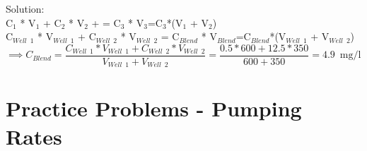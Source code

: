 \begin{enumerate}
\vspace{0.2cm}
Solution:\\
\vspace{0.2cm}
C$_1$ * V$_1$ + C$_2$ * V$_2$ + =  C$_3$ * V$_3$=C$_3$*(V$_1$ + V$_2$)\\
\vspace{0.2cm}
C$_{Well \enspace 1}$ * V$_{Well \enspace 1}$ + C$_{Well \enspace 2}$ * V$_{Well \enspace 2}$ =  C$_{Blend}$ * V$_{Blend}$=C$_{Blend}$*(V$_{Well \enspace1}$ + V$_{Well \enspace 2}$)\\
\vspace{0.3cm}
$\implies C_{Blend}=\dfrac{C_{Well \enspace 1} * V_{Well \enspace 1} + C_{Well \enspace 2} * V_{Well \enspace 2}}{V_{Well \enspace 1} + V_{Well \enspace 2}}=\dfrac{0.5*600+12.5*350}{600+350}=\boxed{4.9 \enspace \textrm{mg/l}}$
\end{enumerate}

\section*{Practice Problems - Pumping Rates} 

